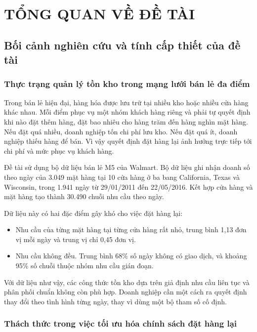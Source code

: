 \chapter{TỔNG QUAN VỀ ĐỀ TÀI}
\label{chap:tongquan}

\section{Bối cảnh nghiên cứu và tính cấp thiết của đề tài}
\label{sec:boicanh}

\subsection{Thực trạng quản lý tồn kho trong mạng lưới bán lẻ đa điểm}
\label{subsec:thuctrang}

Trong bán lẻ hiện đại, hàng hóa được lưu trữ tại nhiều kho hoặc nhiều cửa hàng khác nhau. Mỗi điểm phục vụ một nhóm khách hàng riêng và phải tự quyết định khi nào đặt thêm hàng, đặt bao nhiêu cho hàng trăm đến hàng nghìn mặt hàng. Nếu đặt quá nhiều, doanh nghiệp tốn chi phí lưu kho. Nếu đặt quá ít, doanh nghiệp thiếu hàng để bán. Vì vậy quyết định đặt hàng lại ảnh hưởng trực tiếp tới chi phí và mức phục vụ khách hàng.

Đề tài sử dụng bộ dữ liệu bán lẻ M5 của Walmart. Bộ dữ liệu ghi nhận doanh số theo ngày của 3.049 mặt hàng tại 10 cửa hàng ở ba bang California, Texas và Wisconsin, trong 1.941 ngày từ 29/01/2011 đến 22/05/2016. Kết hợp cửa hàng và mặt hàng tạo thành 30.490 chuỗi nhu cầu theo ngày.

Dữ liệu này có hai đặc điểm gây khó cho việc đặt hàng lại:
\begin{itemize}
    \item Nhu cầu của từng mặt hàng tại từng cửa hàng rất nhỏ, trung bình 1,13 đơn vị mỗi ngày và trung vị chỉ 0,45 đơn vị.
    \item Nhu cầu không đều. Trung bình 68\% số ngày không có giao dịch, và khoảng 95\% số chuỗi thuộc nhóm nhu cầu gián đoạn.
\end{itemize}

Với dữ liệu như vậy, các công thức tồn kho dựa trên giả định nhu cầu liên tục và phân phối chuẩn không còn phù hợp. Doanh nghiệp cần một cách ra quyết định thay đổi theo tình hình từng ngày, thay vì dùng một bộ tham số cố định.

\subsection{Thách thức trong việc tối ưu hóa chính sách đặt hàng lại}
\label{subsec:thachthuc}

